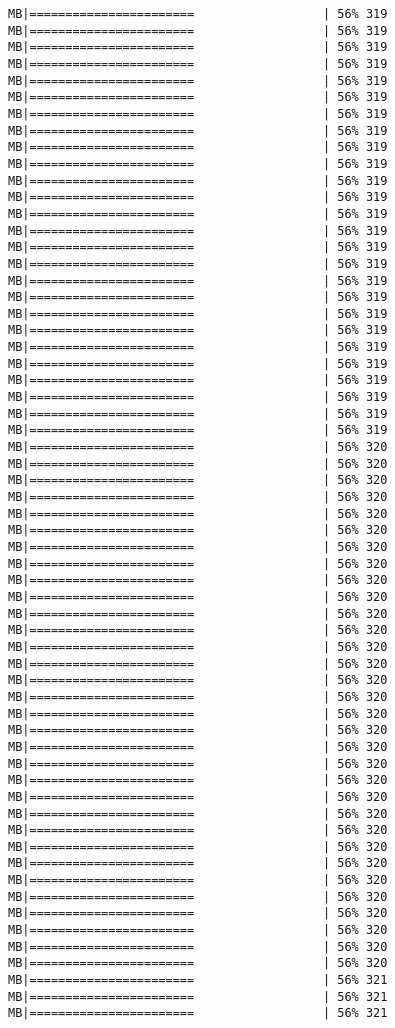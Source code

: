 \documentclass[
]{article}
\begin{document}
\begin{verbatim}
MB|=======================                  | 56% 319 MB|=======================                  | 56% 319 MB|=======================                  | 56% 319 MB|=======================                  | 56% 319 MB|=======================                  | 56% 319 MB|=======================                  | 56% 319 MB|=======================                  | 56% 319 MB|=======================                  | 56% 319 MB|=======================                  | 56% 319 MB|=======================                  | 56% 319 MB|=======================                  | 56% 319 MB|=======================                  | 56% 319 MB|=======================                  | 56% 319 MB|=======================                  | 56% 319 MB|=======================                  | 56% 319 MB|=======================                  | 56% 319 MB|=======================                  | 56% 319 MB|=======================                  | 56% 319 MB|=======================                  | 56% 319 MB|=======================                  | 56% 319 MB|=======================                  | 56% 319 MB|=======================                  | 56% 319 MB|=======================                  | 56% 319 MB|=======================                  | 56% 319 MB|=======================                  | 56% 319 MB|=======================                  | 56% 319 MB|=======================                  | 56% 320 MB|=======================                  | 56% 320 MB|=======================                  | 56% 320 MB|=======================                  | 56% 320 MB|=======================                  | 56% 320 MB|=======================                  | 56% 320 MB|=======================                  | 56% 320 MB|=======================                  | 56% 320 MB|=======================                  | 56% 320 MB|=======================                  | 56% 320 MB|=======================                  | 56% 320 MB|=======================                  | 56% 320 MB|=======================                  | 56% 320 MB|=======================                  | 56% 320 MB|=======================                  | 56% 320 MB|=======================                  | 56% 320 MB|=======================                  | 56% 320 MB|=======================                  | 56% 320 MB|=======================                  | 56% 320 MB|=======================                  | 56% 320 MB|=======================                  | 56% 320 MB|=======================                  | 56% 320 MB|=======================                  | 56% 320 MB|=======================                  | 56% 320 MB|=======================                  | 56% 320 MB|=======================                  | 56% 320 MB|=======================                  | 56% 320 MB|=======================                  | 56% 320 MB|=======================                  | 56% 320 MB|=======================                  | 56% 320 MB|=======================                  | 56% 320 MB|=======================                  | 56% 320 MB|=======================                  | 56% 321 MB|=======================                  | 56% 321 MB|=======================                  | 56% 321 
\end{verbatim}
\end{document}
